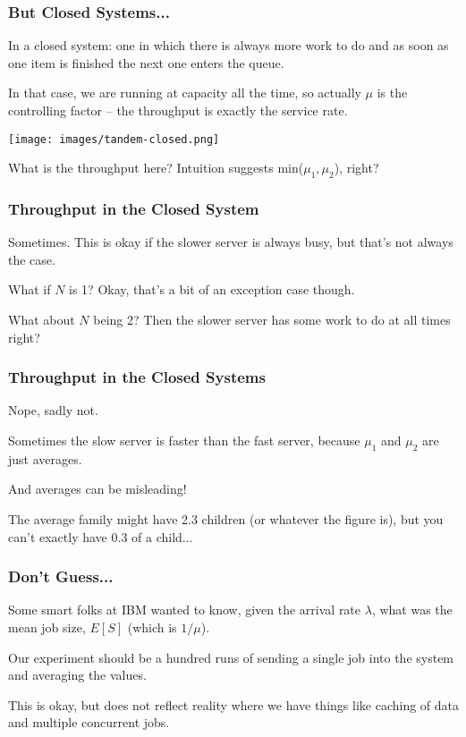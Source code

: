 \begin{frame}
\frametitle{But Closed Systems...}


In a closed system: one in which there is always more work to do and as soon as one item is finished the next one enters the queue. 

 In that case, we are running at capacity all the time, so actually $\mu$ is the controlling factor -- the throughput is exactly the service rate. 
 
 \begin{center}
	\texttt{[image: images/tandem-closed.png]}
\end{center}

What is the throughput here?  Intuition suggests min($\mu_{1}, \mu_{2}$), right? 

\end{frame}



\begin{frame}
\frametitle{Throughput in the Closed System}



Sometimes. This is okay if the slower server is always busy, but that's not always the case. 

What if $N$ is 1? Okay, that's a bit of an exception case though. 

What about $N$ being 2? Then the slower server has some work to do at all times right?

\end{frame}



\begin{frame}
\frametitle{Throughput in the Closed Systems}

Nope, sadly not. 

Sometimes the slow server is faster than the fast server, because $\mu_{1}$ and $\mu_{2}$ are just averages. 

And averages can be misleading! 

The average family might have 2.3 children (or whatever the figure is), but you can't exactly have 0.3 of a child...

\end{frame}



\begin{frame}
\frametitle{Don't Guess...}
Some smart folks at IBM wanted to know, given the arrival rate $\lambda$, what was the mean job size, $E[S]$ (which is $1/\mu$). 

Our experiment should be a hundred runs of sending a single job into the system and averaging the values. 

This is okay, but does not reflect reality where we have things like caching of data and multiple concurrent jobs. 

\end{frame}



